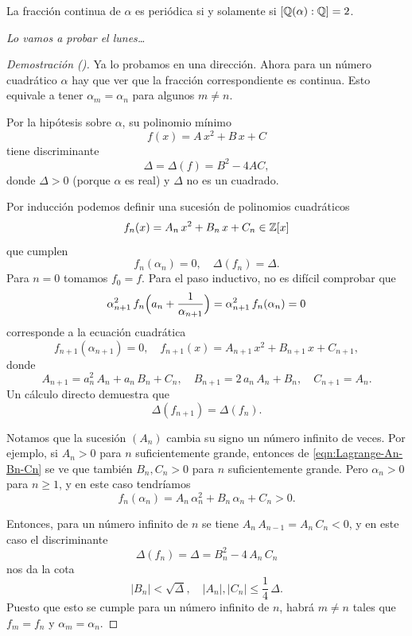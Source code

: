 \begin{teorema}[Lagrange]
  La fracción continua de $\alpha$ es periódica si y solamente si
  $[\mathbb{Q} (\alpha) : \mathbb{Q}] = 2$.
\end{teorema}

\vspace{1em}

\noindent\emph{Lo vamos a probar el lunes\dots}

\iffalse

\begin{proof}[Demostración (\cite{Steinig-1992})]
  Ya lo probamos en una dirección. Ahora para un número cuadrático $\alpha$
  hay que ver que la fracción correspondiente es continua. Esto equivale a
  tener $\alpha_m = \alpha_n$ para algunos $m \ne n$.

  Por la hipótesis sobre $\alpha$, su polinomio mínimo
  $$f (x) = A\,x^2 + B\,x + C$$
  tiene discriminante
  $$\Delta = \Delta (f) = B^2 - 4 A C,$$
  donde $\Delta > 0$ (porque $\alpha$ es real) y $\Delta$ no es un cuadrado.

  Por inducción podemos definir una sucesión de polinomios cuadráticos
  $$f_n (x) = A_n\,x^2 + B_n\,x + C_n \in \mathbb{Z} [x]$$
  que cumplen
  $$f_n (\alpha_n) = 0, \quad \Delta (f_n) = \Delta.$$
  Para $n = 0$ tomamos $f_0 = f$. Para el paso inductivo, no es difícil
  comprobar que
  $$\alpha_{n+1}^2 \, f_n \Bigl(a_n + \frac{1}{\alpha_{n+1}}\Bigr) = \alpha_{n+1}^2 \, f_n (\alpha_n) = 0$$
  corresponde a la ecuación cuadrática
  \[ f_{n+1} (\alpha_{n+1}) = 0, \quad
     f_{n+1} (x) = A_{n+1}\,x^2 + B_{n+1}\,x + C_{n+1}, \]
  donde
  \begin{equation}
    \label{eqn:Lagrange-An-Bn-Cn}
    A_{n+1} = a_n^2\,A_n + a_n\,B_n + C_n, \quad
    B_{n+1} = 2\,a_n\,A_n + B_n, \quad
    C_{n+1} = A_n.
  \end{equation}
  Un cálculo directo demuestra que
  $$\Delta (f_{n+1}) = \Delta (f_n).$$

  Notamos que la sucesión $(A_n)$ cambia su signo un número infinito de
  veces. Por ejemplo, si $A_n > 0$ para $n$ suficientemente grande, entonces
  de \eqref{eqn:Lagrange-An-Bn-Cn} se ve que también $B_n, C_n > 0$ para $n$
  suficientemente grande. Pero $\alpha_n > 0$ para $n \ge 1$, y en este caso
  tendríamos
  $$f_n (\alpha_n) = A_n\,\alpha_n^2 + B_n\,\alpha_n + C_n > 0.$$

  Entonces, para un número infinito de $n$ se tiene
  $A_n\,A_{n-1} = A_n\,C_n < 0$, y en este caso el discriminante
  $$\Delta (f_n) = \Delta = B_n^2 - 4\,A_n\,C_n$$
  nos da la cota
  $$|B_n| < \sqrt{\Delta}, \quad |A_n|, |C_n| \le \frac{1}{4}\,\Delta.$$
  Puesto que esto se cumple para un número infinito de $n$, habrá $m\ne n$
  tales que $f_m = f_n$ y $\alpha_m = \alpha_n$.
\end{proof}

